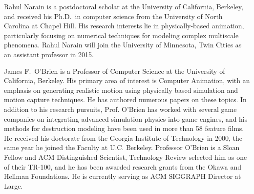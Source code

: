 \documentclass[10pt,journal,compsoc,twoside]{TexInputs/IEEEtran}
\begin{document}
\begin{IEEEbiography}
{Rahul Narain}
is a postdoctoral scholar at the University of California, Berkeley, and received his Ph.D.~in computer science from the University of North Carolina at Chapel Hill. His research interests lie in physically-based animation, particularly focusing on numerical techniques for modeling complex multiscale phenomena. Rahul Narain will join the University of Minnesota, Twin Cities as an assistant professor in 2015.
\end{IEEEbiography}

\begin{IEEEbiography}
{James F.~O'Brien}
is a Professor of Computer Science at the University of
California, Berkeley. His primary area of interest is Computer Animation, with
an emphasis on generating realistic motion using physically based simulation
and motion capture techniques. He has authored numerous papers on these topics.
In addition to his research pursuits, Prof. O'Brien has worked with several
game companies on integrating advanced simulation physics into game engines,
and his methods for destruction modeling have been used in more than 58 feature
films. He received his doctorate from the Georgia Institute of Technology in
2000, the same year he joined the Faculty at U.C. Berkeley. Professor O'Brien
is a Sloan Fellow and ACM Distinguished Scientist, Technology Review selected
him as one of their TR-100, and he has been awarded research grants from the
Okawa and Hellman Foundations. He is currently serving as ACM SIGGRAPH Director
at Large.
\end{IEEEbiography}


\vfill
\end{document}

